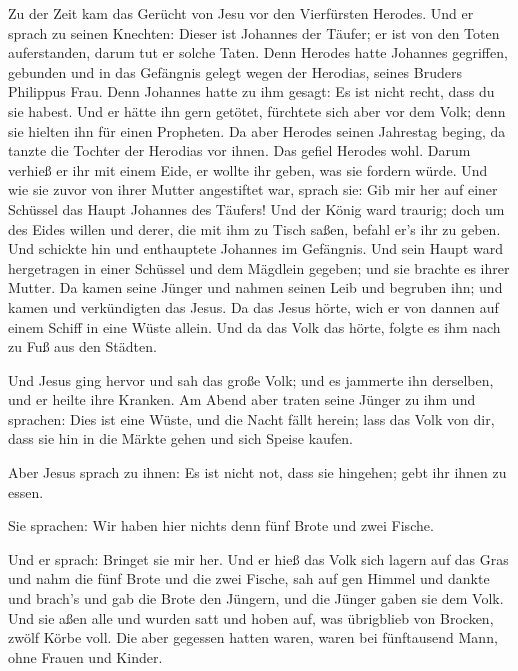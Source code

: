  Zu der Zeit kam das Gerücht von Jesu vor den Vierfürsten
Herodes.  Und er sprach zu seinen Knechten: Dieser ist
Johannes der Täufer; er ist von den Toten auferstanden, darum tut er
solche Taten.  Denn Herodes hatte Johannes gegriffen,
gebunden und in das Gefängnis gelegt wegen der Herodias, seines Bruders
Philippus Frau.  Denn Johannes hatte zu ihm gesagt: Es ist
nicht recht, dass du sie habest.  Und er hätte ihn gern
getötet, fürchtete sich aber vor dem Volk; denn sie hielten ihn für
einen Propheten.  Da aber Herodes seinen Jahrestag beging,
da tanzte die Tochter der Herodias vor ihnen. Das gefiel Herodes wohl.
 Darum verhieß er ihr mit einem Eide, er wollte ihr geben,
was sie fordern würde.  Und wie sie zuvor von ihrer Mutter
angestiftet war, sprach sie: Gib mir her auf einer Schüssel das Haupt
Johannes des Täufers!  Und der König ward traurig; doch um
des Eides willen und derer, die mit ihm zu Tisch saßen, befahl er's ihr
zu geben.  Und schickte hin und enthauptete Johannes im
Gefängnis.  Und sein Haupt ward hergetragen in einer
Schüssel und dem Mägdlein gegeben; und sie brachte es ihrer Mutter.
 Da kamen seine Jünger und nahmen seinen Leib und
begruben ihn; und kamen und verkündigten das Jesus.  Da
das Jesus hörte, wich er von dannen auf einem Schiff in eine Wüste
allein. Und da das Volk das hörte, folgte es ihm nach zu Fuß aus den
Städten.

 Und Jesus ging hervor und sah das große Volk; und es
jammerte ihn derselben, und er heilte ihre Kranken.  Am
Abend aber traten seine Jünger zu ihm und sprachen: Dies ist eine Wüste,
und die Nacht fällt herein; lass das Volk von dir, dass sie hin in die
Märkte gehen und sich Speise kaufen.

 Aber Jesus sprach zu ihnen: Es ist nicht not, dass sie
hingehen; gebt ihr ihnen zu essen.

 Sie sprachen: Wir haben hier nichts denn fünf Brote und
zwei Fische.

 Und er sprach: Bringet sie mir her.  Und
er hieß das Volk sich lagern auf das Gras und nahm die fünf Brote und
die zwei Fische, sah auf gen Himmel und dankte und brach's und gab die
Brote den Jüngern, und die Jünger gaben sie dem Volk. 
Und sie aßen alle und wurden satt und hoben auf, was übrigblieb von
Brocken, zwölf Körbe voll.  Die aber gegessen hatten
waren, waren bei fünftausend Mann, ohne Frauen und Kinder.

